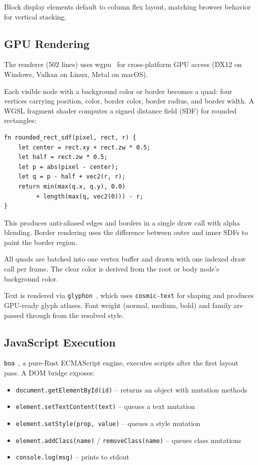 \documentclass[11pt,twocolumn]{article}
\begin{document}
Block display elements default to column flex layout, matching browser behavior for vertical stacking.

\subsection{GPU Rendering}

The renderer (502 lines) uses wgpu~\cite{wgpu} for cross-platform GPU access (DX12 on Windows, Vulkan on Linux, Metal on macOS).

Each visible node with a background color or border becomes a quad: four vertices carrying position, color, border color, border radius, and border width. A WGSL fragment shader computes a signed distance field (SDF) for rounded rectangles:

\begin{lstlisting}[caption={SDF rounded rectangle shader (WGSL, simplified)}]
fn rounded_rect_sdf(pixel, rect, r) {
    let center = rect.xy + rect.zw * 0.5;
    let half = rect.zw * 0.5;
    let p = abs(pixel - center);
    let q = p - half + vec2(r, r);
    return min(max(q.x, q.y), 0.0)
         + length(max(q, vec2(0))) - r;
}
\end{lstlisting}

This produces anti-aliased edges and borders in a single draw call with alpha blending. Border rendering uses the difference between outer and inner SDFs to paint the border region.

All quads are batched into one vertex buffer and drawn with one indexed draw call per frame. The clear color is derived from the root or body node's background color.

Text is rendered via \texttt{glyphon}~\cite{glyphon}, which uses \texttt{cosmic-text} for shaping and produces GPU-ready glyph atlases. Font weight (normal, medium, bold) and family are passed through from the resolved style.

\subsection{JavaScript Execution}

\texttt{boa}~\cite{boa}, a pure-Rust ECMAScript engine, executes scripts after the first layout pass. A DOM bridge exposes:

\begin{itemize}
\item \texttt{document.getElementById(id)} -- returns an object with mutation methods
\item \texttt{element.setTextContent(text)} -- queues a text mutation
\item \texttt{element.setStyle(prop, value)} -- queues a style mutation
\item \texttt{element.addClass(name)} / \texttt{removeClass(name)} -- queues class mutations
\item \texttt{console.log(msg)} -- prints to stdout
\end{itemize}
\end{document}
